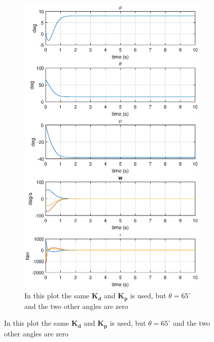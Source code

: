 \begin{figure}[ht]
	~ %
	\begin{subfigure}[b]{0.40\textwidth}
		\includegraphics[width=\textwidth]{1000Rot65}
		\caption{In this plot the same $\boldsymbol{K_d}$ and $\boldsymbol{K_p}$ is used, but $\theta=65^\circ$ and the two other angles are zero}
		\label{fig:2b}
	\end{subfigure}
\end{figure}